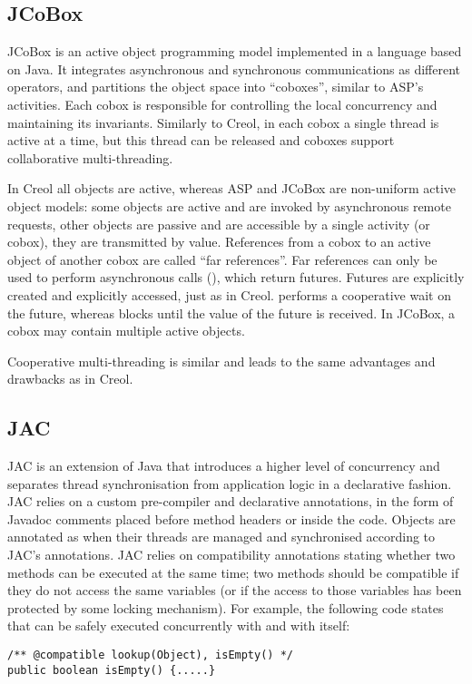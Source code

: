 \subsection{JCoBox}
JCoBox \cite{schafer2010jcobox} is an active object programming model
implemented in a language based on Java.  It integrates asynchronous
and synchronous communications as different operators, and partitions the
object space into ``coboxes'', similar to ASP's
activities. Each cobox is responsible for controlling the local
concurrency and maintaining its invariants. 
Similarly to Creol, in each cobox a single thread is active at a time, but this thread can be released and coboxes
support collaborative multi-threading.


In Creol \cite{Johnsen2006a} all objects are active, whereas ASP
and JCoBox are non-uniform active object models: some objects are active and are invoked by asynchronous
remote requests, other objects are passive and are accessible by a
single activity (or cobox), they are transmitted by value.  References
from a cobox to an active object of another cobox are called ``far
references''. Far references can only be used to perform asynchronous
calls (), which return futures.  Futures are
explicitly created and explicitly accessed, just as in Creol.
 performs a cooperative wait on the future, whereas
 blocks until the value of the future is received.  In
JCoBox,  a cobox may contain multiple active objects.

Cooperative multi-threading is similar and leads to the same
advantages and drawbacks as  in Creol. 


 



\subsection{JAC}

JAC \cite{lohr2006jac}  is an extension of Java that introduces a
higher level of concurrency and separates thread synchronisation from
application logic in a declarative fashion. JAC relies on a custom
pre-compiler and declarative annotations, in the form of Javadoc
comments placed before method headers or inside the code. Objects are
annotated as  when their threads are managed and
synchronised according to JAC's annotations. JAC relies on
compatibility annotations stating whether two methods can be executed
at the same time; two methods should be compatible if they do not
access the same variables (or if the access to those variables has
been protected by some locking mechanism).  For example, the following
code states that  can be safely executed concurrently
with  and with itself:
\begin{lstlisting}
/** @compatible lookup(Object), isEmpty() */
public boolean isEmpty() {.....}
\end{lstlisting} 

